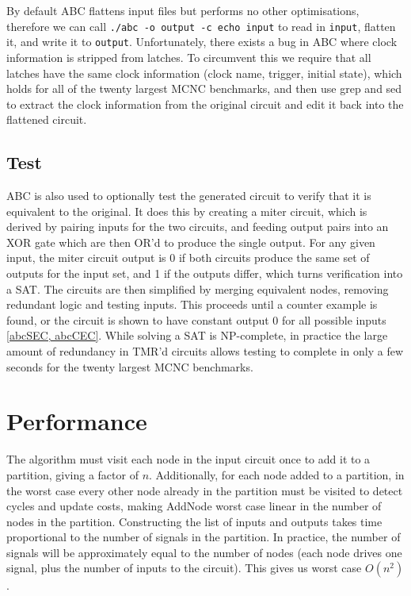 \documentclass[12pt,final,oneside]{dwThesis} %
\begin{document}
   By default \gls{ABC} flattens input files but performs no other optimisations, therefore we can call
   \texttt{./abc -o output -c echo input} to read in \texttt{input}, flatten it, and write it to \texttt{output}.
   Unfortunately, there exists a bug in \gls{ABC} where clock information is stripped from latches.
   To circumvent this we require that all latches have the same clock information (clock name, trigger, initial state),
   which holds for all of the twenty largest \gls{MCNC} benchmarks,
   and then use grep and sed to extract the clock information from the original circuit and edit it back into the flattened circuit.


   \subsection{Test}
   \label{algTest} \gls{ABC} is also used to optionally test
   the generated circuit to verify that it is equivalent to the original. It
   does this by creating a miter circuit, which is derived by pairing inputs
   for the two circuits, and feeding output pairs into an XOR gate which are
   then OR'd to produce the single output. For any given input, the miter
   circuit output is 0 if both circuits produce the same set of outputs for the
   input set, and 1 if the outputs differ, which turns verification into a
   \gls{SAT}.  The circuits are then simplified by merging equivalent nodes,
   removing redundant logic and testing inputs.
   This proceeds until a counter example is found, or the circuit is shown to
   have constant output 0 for all possible inputs \ref{abcSEC, abcCEC}.  While
   solving a \gls{SAT} is NP-complete, in practice the large amount of
   redundancy in \gls{TMR}'d circuits allows testing to complete in only a few
   seconds for the twenty largest \gls{MCNC} benchmarks.


   \section{Performance}
   The algorithm must visit each node in the input
   circuit once to add it to a partition, giving a factor of $n$.
   Additionally, for each node added to a partition, in the worst case every
   other node already in the partition must be visited to detect cycles and
   update costs, making AddNode worst case linear in the number of nodes in the
   partition.  Constructing the list of inputs and outputs takes time
   proportional to the number of signals in the partition. In practice, the
   number of signals will be approximately equal to the number of nodes (each
   node drives one signal, plus the number of inputs to the circuit).  This
   gives us worst case $O(n^2)$.
   
\end{document}
